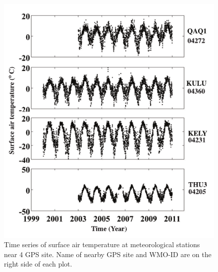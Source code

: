 \clearpage
\begin{figure}
	\centering
	\includegraphics{figs_chpt3/2012GC004432-pA07.pdf}
	\caption[Time series of surface air temperature at meteorological stations near 4 GPS site.]{Time series of surface air temperature at meteorological stations near 4 GPS site.  Name of nearby GPS site and WMO-ID are on the right side of each plot. }
	\label{fig:SI3_fig7}
\end{figure}

